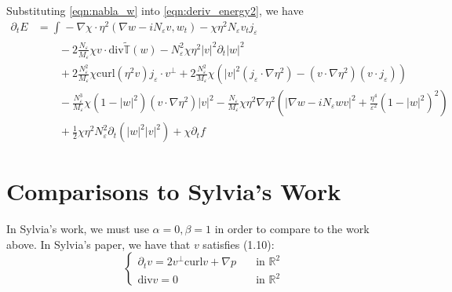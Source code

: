 \documentclass[a4paper]{article}
\newcommand{\R}{\mathbb{R}}
\newcommand{\curl}{\mathrm{curl}}
\renewcommand{\div}{\mathrm{div}}
\begin{document}
Substituting \eqref{eqn:nabla_w} into \eqref{eqn:deriv_energy2}, we have
\begin{align}
  \partial_t E &= \int_{}^{} -\nabla \chi \cdot \eta^2 ( \nabla w - i N_\varepsilon v, w_t ) - \chi \eta^2 N_\varepsilon v_t j_\varepsilon \nonumber \\
  &\quad \quad - 2 \frac{N_\varepsilon}{M_\varepsilon} \chi v \cdot \div \tilde{\mathbb{T}} (w) - N_\varepsilon^2 \chi \eta^2 |v|^2 \partial_t |w|^2
  \nonumber \\
  &\quad \quad + 2 \frac{N_\varepsilon^2}{M_\varepsilon} \chi \curl ( \eta^2 v ) j_\varepsilon \cdot v^\perp + 2 \frac{N_\varepsilon^2}{M_\varepsilon}
  \chi \left( |v|^2 ( j_\varepsilon \cdot \nabla \eta^2 ) - (v \cdot \nabla \eta^2) ( v \cdot j_\varepsilon ) \right) \nonumber \\
  &\quad \quad - \frac{N_\varepsilon^3}{M_\varepsilon} \chi ( 1 - |w|^2 ) (v \cdot \nabla \eta^2) |v|^2 - \frac{N_\varepsilon}{M_\varepsilon} \chi
  \eta^2 \nabla \eta^2 \left( | \nabla w - i N_\varepsilon w v |^2 + \frac{\eta^4}{\varepsilon^2} ( 1 - |w|^2)^2 \right) \nonumber \\
  &\quad \quad + \frac{1}{2} \chi \eta^2 N_\varepsilon^2 \partial_t ( |w|^2 |v|^2 ) + \chi \partial_t f
  \label{eqn:deriv_energy3}
\end{align}

%

\section{Comparisons to Sylvia's Work}
In Sylvia's work, we must use $\alpha = 0, \beta = 1$ in order to compare to the work above.
In Sylvia's paper, we have that $v$ satisfies (1.10):
\begin{equation}
  \begin{cases}
    \partial_t v = 2 v^\perp \curl v + \nabla p &\quad \text{in } \R^2 \\
    \div v = 0 &\quad \text{in } \R^2
  \end{cases}
  \label{eqn:1.10}
\end{equation}
\end{document}
